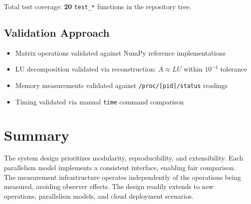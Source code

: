 Total test coverage: \textbf{20} \texttt{test\_*} functions in the repository tree.

\subsection{Validation Approach}

\begin{itemize}
    \item Matrix operations validated against NumPy reference implementations
    \item LU decomposition validated via reconstruction: $A \approx LU$ within $10^{-4}$ tolerance
    \item Memory measurements validated against \texttt{/proc/[pid]/status} readings
    \item Timing validated via manual \texttt{time} command comparison
\end{itemize}

\section{Summary}

The system design prioritizes modularity, reproducibility, and extensibility. Each parallelism model implements a consistent interface, enabling fair comparison. The measurement infrastructure operates independently of the operations being measured, avoiding observer effects. The design readily extends to new operations, parallelism models, and cloud deployment scenarios.
